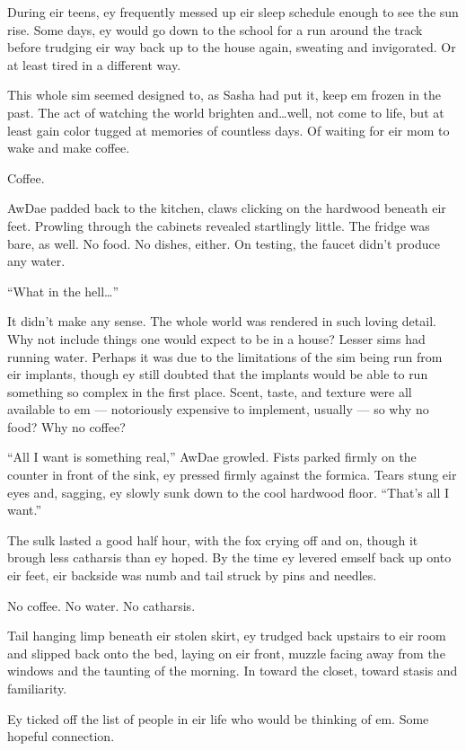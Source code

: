 During eir teens, ey frequently messed up eir sleep schedule enough to see the sun rise. Some days, ey would go down to the school for a run around the track before trudging eir way back up to the house again, sweating and invigorated. Or at least tired in a different way.

This whole sim seemed designed to, as Sasha had put it, keep em frozen in the past. The act of watching the world brighten and\ldots{}well, not come to life, but at least gain color tugged at memories of countless days. Of waiting for eir mom to wake and make coffee.

Coffee.

AwDae padded back to the kitchen, claws clicking on the hardwood beneath eir feet. Prowling through the cabinets revealed startlingly little. The fridge was bare, as well. No food. No dishes, either. On testing, the faucet didn't produce any water.

``What in the hell\ldots{}''

It didn't make any sense. The whole world was rendered in such loving detail. Why not include things one would expect to be in a house? Lesser sims had running water. Perhaps it was due to the limitations of the sim being run from eir implants, though ey still doubted that the implants would be able to run something so complex in the first place. Scent, taste, and texture were all available to em — notoriously expensive to implement, usually — so why no food? Why no coffee?

``All I want is something real,'' AwDae growled. Fists parked firmly on the counter in front of the sink, ey pressed firmly against the formica. Tears stung eir eyes and, sagging, ey slowly sunk down to the cool hardwood floor. ``That's all I want.''

The sulk lasted a good half hour, with the fox crying off and on, though it brough less catharsis than ey hoped. By the time ey levered emself back up onto eir feet, eir backside was numb and tail struck by pins and needles.

No coffee. No water. No catharsis.

Tail hanging limp beneath eir stolen skirt, ey trudged back upstairs to eir room and slipped back onto the bed, laying on eir front, muzzle facing away from the windows and the taunting of the morning. In toward the closet, toward stasis and familiarity.

Ey ticked off the list of people in eir life who would be thinking of em. Some hopeful connection.

